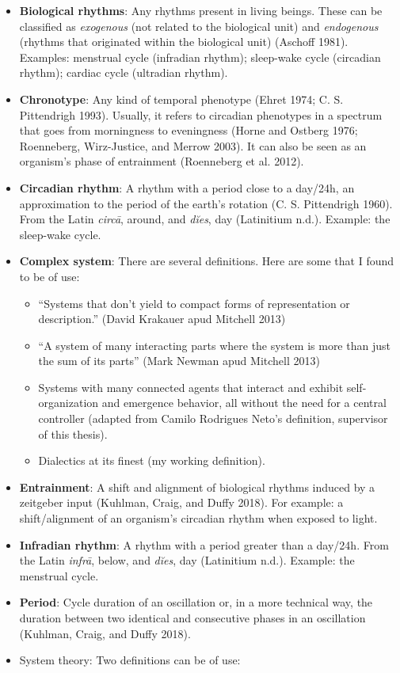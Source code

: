 \documentclass[
  12pt,
  a4paper,
  oneside]{tesesusp}
\providecommand{\tightlist}{%
  \setlength{\itemsep}{0pt}\setlength{\parskip}{0pt}}\usepackage{longtable,booktabs,array}
\begin{document}
\begin{itemize}
\tightlist
\item
  \textbf{Biological rhythms}: Any rhythms present in living beings.
  These can be classified as \emph{exogenous} (not related to the
  biological unit) and \emph{endogenous} (rhythms that originated within
  the biological unit) (Aschoff 1981). Examples: menstrual cycle
  (infradian rhythm); sleep-wake cycle (circadian rhythm); cardiac cycle
  (ultradian rhythm).
\item
  \textbf{Chronotype}: Any kind of temporal phenotype (Ehret 1974; C. S.
  Pittendrigh 1993). Usually, it refers to circadian phenotypes in a
  spectrum that goes from morningness to eveningness (Horne and Ostberg
  1976; Roenneberg, Wirz-Justice, and Merrow 2003). It can also be seen
  as an organism's phase of entrainment (Roenneberg et al. 2012).
\item
  \textbf{Circadian rhythm}: A rhythm with a period close to a day/24h,
  an approximation to the period of the earth's rotation (C. S.
  Pittendrigh 1960). From the Latin \emph{circā}, around, and
  \emph{dĭes}, day (Latinitium n.d.). Example: the sleep-wake cycle.
\item
  \textbf{Complex system}: There are several definitions. Here are some
  that I found to be of use:

  \begin{itemize}
  \tightlist
  \item
    ``Systems that don't yield to compact forms of representation or
    description.'' (David Krakauer apud Mitchell 2013)
  \item
    ``A system of many interacting parts where the system is more than
    just the sum of its parts'' (Mark Newman apud Mitchell 2013)
  \item
    Systems with many connected agents that interact and exhibit
    self-organization and emergence behavior, all without the need for a
    central controller (adapted from Camilo Rodrigues Neto's definition,
    supervisor of this thesis).
  \item
    Dialectics at its finest (my working definition).
  \end{itemize}
\item
  \textbf{Entrainment}: A shift and alignment of biological rhythms
  induced by a zeitgeber input (Kuhlman, Craig, and Duffy 2018). For
  example: a shift/alignment of an organism's circadian rhythm when
  exposed to light.
\item
  \textbf{Infradian rhythm}: A rhythm with a period greater than a
  day/24h. From the Latin \emph{infrā}, below, and \emph{dĭes}, day
  (Latinitium n.d.). Example: the menstrual cycle.
\item
  \textbf{Period}: Cycle duration of an oscillation or, in a more
  technical way, the duration between two identical and consecutive
  phases in an oscillation (Kuhlman, Craig, and Duffy 2018).
\item
  System theory: Two definitions can be of use:


\end{itemize}
\end{document}
